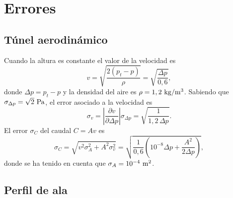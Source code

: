 
\newpage
\section{Errores}

\subsection{T\'unel aerodin\'amico}

Cuando la altura es constante el valor de la velocidad es
%
\begin{equation*}
  v = \sqrt{\frac{2(p_t - p)}{\rho}} = \sqrt{\frac{\Delta p}{0,6}},
\end{equation*}
%
donde $\Delta p = p_t - p$ y la densidad del aire es $\rho = 1,2~{\rm kg/m^3}$. Sabiendo que $\sigma_{\Delta p} = \sqrt{2}~{\rm Pa}$, el error asociado a la velocidad es
%
\begin{equation*}
  \sigma_v = \left|\frac{\partial v}{\partial \Delta p}\right|\sigma_{\Delta p} = \sqrt{\frac{1}{1,2\,\Delta p}}.
\end{equation*}
%
El error $\sigma_C$ del caudal $C = Av$ es
%
\begin{equation*}
  \sigma_C = \sqrt{v^2\sigma_A^2 + A^2 \sigma_v^2} = \sqrt{\frac{1}{0,6}\left(10^{-8}\Delta p + \frac{A^2}{2 \Delta p}\right)},
\end{equation*}
%
donde se ha tenido en cuenta que $\sigma_A = 10^{-4}~{\rm m^2}$.

\subsection{Perfil de ala}

